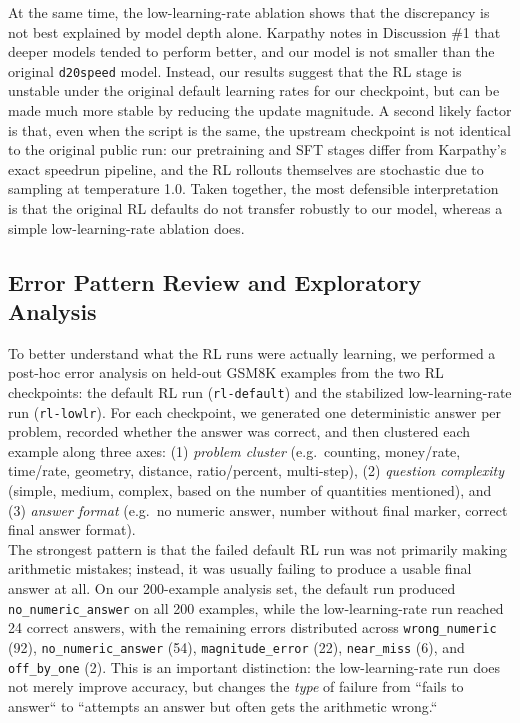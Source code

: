 \documentclass[a4paper,12pt]{article}
\begin{document}
At the same time, the low-learning-rate ablation shows that the discrepancy is not best explained by model depth alone. Karpathy notes in Discussion \#1 that deeper models tended to perform better, and our model is not smaller than the original \texttt{d20speed} model. Instead, our results suggest that the RL stage is unstable under the original default learning rates for our checkpoint, but can be made much more stable by reducing the update magnitude. A second likely factor is that, even when the script is the same, the upstream checkpoint is not identical to the original public run: our pretraining and SFT stages differ from Karpathy's exact speedrun pipeline, and the RL rollouts themselves are stochastic due to sampling at temperature 1.0. Taken together, the most defensible interpretation is that the original RL defaults do not transfer robustly to our model, whereas a simple low-learning-rate ablation does.

\subsection{Error Pattern Review and Exploratory Analysis}

To better understand what the RL runs were actually learning, we performed a post-hoc error analysis on held-out GSM8K examples from the two RL checkpoints: the default RL run (\texttt{rl-default}) and the stabilized low-learning-rate run (\texttt{rl-lowlr}). For each checkpoint, we generated one deterministic answer per problem, recorded whether the answer was correct, and then clustered each example along three axes: (1) \emph{problem cluster} (e.g.\ counting, money/rate, time/rate, geometry, distance, ratio/percent, multi-step), (2) \emph{question complexity} (simple, medium, complex, based on the number of quantities mentioned), and (3) \emph{answer format} (e.g.\ no numeric answer, number without final marker, correct final answer format).\\

The strongest pattern is that the failed default RL run was not primarily making arithmetic mistakes; instead, it was usually failing to produce a usable final answer at all. On our 200-example analysis set, the default run produced \texttt{no\_numeric\_answer} on all 200 examples, while the low-learning-rate run reached 24 correct answers, with the remaining errors distributed across \texttt{wrong\_numeric} (92), \texttt{no\_numeric\_answer} (54), \texttt{magnitude\_error} (22), \texttt{near\_miss} (6), and \texttt{off\_by\_one} (2). This is an important distinction: the low-learning-rate run does not merely improve accuracy, but changes the \emph{type} of failure from ``fails to answer`` to ``attempts an answer but often gets the arithmetic wrong.``\\
\end{document}
